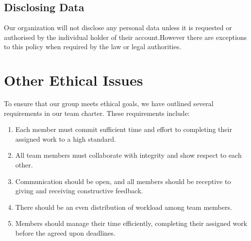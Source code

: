 \subsection{Disclosing Data}
Our organization will not disclose any personal data unless it is requested or authorised by the individual holder of their account.However there are exceptions to this policy when required by the law or legal authorities.

\section{Other Ethical Issues}


To ensure that our group meets ethical goals, we have outlined several requirements in our team charter. These requirements include:

\begin{enumerate}
  \item Each member must commit sufficient time and effort to completing their assigned work to a high standard. 
  \item All team members must collaborate with integrity and show respect to each other.
  \item Communication should be open, and all members should be receptive to giving and receiving constructive feedback.
  \item There should be an even distribution of workload among team members.
  \item Members should manage their time efficiently, completing their assigned work before the agreed upon deadlines.
\end{enumerate}
 






